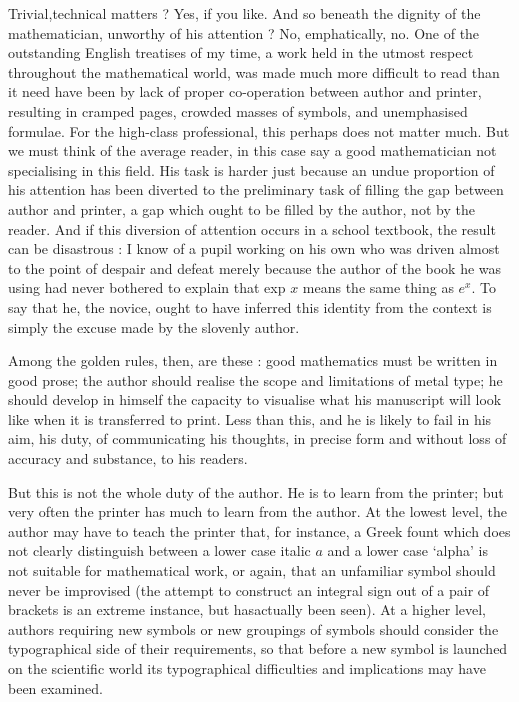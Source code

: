 Trivial,\pageoriginale technical matters ? Yes, if you like. And so beneath the dignity of the mathematician, unworthy of his attention ? No, emphatically, no. One of the outstanding English treatises of my time, a work held in the utmost respect throughout the mathematical world, was made much more difficult to read than it need have been by lack of proper co-operation between author and printer, resulting in cramped pages, crowded masses of symbols, and unemphasised formulae. For the high-class professional, this perhaps does not matter much. But we must think of the average reader, in this case say a good mathematician not specialising in this field. His task is harder just because an undue proportion of his attention has been diverted to the preliminary task of filling the gap between author and printer, a gap which ought to be filled by the author, not by the reader. And if this diversion of attention occurs in a school textbook, the result can be disastrous : I know of a pupil working on his own who was driven almost to the point of despair and defeat merely because the author of the book he was using had never bothered to explain that exp $x$ means the same thing as $e^{x}$. To say that he, the novice, ought to have inferred this identity from the context is simply the excuse made by the slovenly author.

Among the golden rules, then, are these : good mathematics must be written in good prose; the author should realise the scope and limitations of metal type; he should develop in himself the capacity to visualise what his manuscript will look like when it is transferred to print. Less than this, and he is likely to fail in his aim, his duty, of communicating his thoughts, in precise form and without loss of accuracy and substance, to his readers.

But this is not the whole duty of the author. He is to learn from the printer; but very often the printer has much to learn from the author. At the lowest level, the author may have to teach the printer that, for instance, a Greek fount which does not clearly distinguish between a lower case italic $a$ and a lower case `alpha' is not suitable for mathematical work, or again, that an unfamiliar symbol should never be improvised (the attempt to construct an integral sign out of a pair of brackets is an extreme instance, but has\pageoriginale actually been seen). At a higher level, authors requiring new symbols or new groupings of symbols should consider the typographical side of their requirements, so that before a new symbol is launched on the scientific world its typographical difficulties and implications may have been examined.

